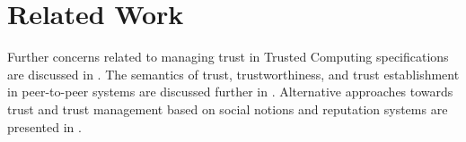 \section{Related Work}
Further concerns related to managing trust in Trusted Computing specifications are discussed in \cite{tmi}. The semantics of trust, trustworthiness, and trust establishment in peer-to-peer systems are discussed further in \cite{Beth1994,Richardson2003,Rowe2016}. Alternative approaches towards trust and trust management based on social notions and reputation systems are presented in \cite{eigentrust,trusttaxonomy,repcloud}.

